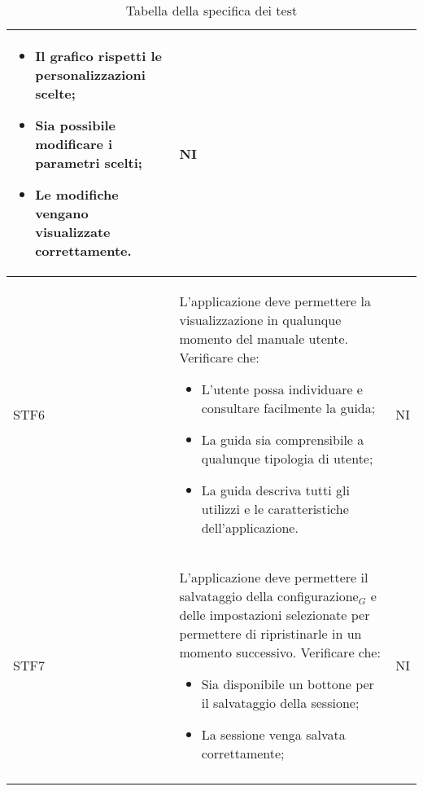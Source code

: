 \begin{center}
\begin{longtable}{|p{1.5cm}|p{11cm}|p{1cm}|}
\begin{itemize}
            \item Il grafico rispetti le personalizzazioni scelte;
            \item Sia possibile modificare i parametri scelti;
            \item Le modifiche vengano visualizzate correttamente.
        \end{itemize} & NI\\ \hline
        \rowcolor[HTML]{EFEFEF}
        STF6 & L'applicazione deve permettere la visualizzazione in qualunque momento del manuale utente. Verificare che: \begin{itemize}
            \item L'utente possa individuare e consultare facilmente la guida;
            \item La guida sia comprensibile a qualunque tipologia di utente;
            \item La guida descriva tutti gli utilizzi e le caratteristiche dell'applicazione.
        \end{itemize} & NI\\ \hline
        \rowcolor[HTML]{C0C0C0}
        STF7 & L'applicazione deve permettere il salvataggio della configurazione$_G$ e delle impostazioni selezionate per permettere di ripristinarle in un momento successivo. Verificare che: \begin{itemize}
            \item Sia disponibile un bottone per il salvataggio della sessione;
            \item La sessione venga salvata correttamente;
        \end{itemize}& NI\\ \hline
        \caption{Tabella della specifica dei test}
    \end{longtable}
\end{center}

